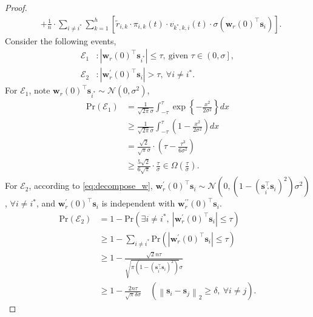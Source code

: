 \documentclass[10pt]{article}
\def\rvs{{\mathbf{s}}}
\def\rvw{{\mathbf{w}}}
\def\pr{{\text{Pr}}}
\def\gN{{\mathcal{N}}}
\def\gE{{\mathcal{E}}}
\begin{document}
\begin{proof}
\begin{equation}
\begin{split}
	&+ \frac{1}{n} \cdot \sum\limits_{i \not= i^*}{\sum\limits_{k=1}^{h}{ \left[ \tilde{r}_{i,k} \cdot \pi_{i,k}(t) \cdot v_{k^*,k,i}(t) \cdot \sigma( \rvw_r(0)^\top \rvs_i ) \right] } }.
\end{split}
\end{equation}
Consider the following events,
\begin{equation*}
\begin{split}
	\gE_1 &: \left| \rvw_r(0)^\top \rvs_{i^*} \right| \le \tau, \ \text{given } \tau \in \left( 0, \sigma \right], \\
	\gE_2 &: \left| \rvw_r^\prime(0)^\top \rvs_i \right| > \tau, \ \forall i \not= i^*.
\end{split}
\end{equation*}
For $\gE_1$, note $\rvw_r(0)^\top \rvs_{i^*} \sim \gN(0, \sigma^2)$,
\begin{equation*}
\begin{split}
	\pr\left(\gE_1\right) &= \frac{1}{\sqrt{2\pi}\sigma} \int_{-\tau}^{\tau}{\exp\left\{ - \frac{x^2}{2\sigma^2} \right\} dx} \\
	&\ge \frac{1}{\sqrt{2\pi}\sigma} \int_{-\tau}^{\tau}{ \left( 1  - \frac{x^2}{2\sigma^2} \right) dx} \\
	&= \frac{\sqrt{2}}{\sqrt{\pi}\sigma} \cdot \left( \tau - \frac{\tau^3}{6\sigma^2}\right) \\
	&\ge \frac{5\sqrt{2}}{6\sqrt{\pi}} \cdot \frac{\tau}{\sigma} \in \Omega\left( \frac{\tau}{\sigma} \right).
\end{split}
\end{equation*}
For $\gE_2$, according to \cref{eq:decompose_w}, $\rvw_r^\prime(0)^\top \rvs_i \sim \gN\left(0, \left(1 - \left(\rvs_{i^*}^\top \rvs_{i} \right)^2 \right)\sigma^2 \right)$, $\forall i \not= i^*$, and $\rvw_r^\prime(0)^\top \rvs_i$ is independent with $\rvw_r^{\prime\prime}(0)^\top \rvs_{i}$.
\begin{equation*}
\begin{split}
	\pr\left(\gE_2\right) &= 1 - \pr\left( \exists i \not= i^*, \ \left| \rvw_r^\prime(0)^\top \rvs_i \right| \le \tau \right) \\
	&\ge 1 - \sum\limits_{i \not= i^*}{ \pr\left(\left| \rvw_r^\prime(0)^\top \rvs_i \right| \le \tau \right) } \\
	&\ge 1 - \frac{\sqrt{2}n\tau}{\sqrt{\pi\left( 1 - \left(\rvs_{i^*}^\top \rvs_{i} \right)^2 \right) }\sigma} \\
	&\ge 1 - \frac{2n\tau}{\sqrt{\pi}\delta\sigma} \quad \left( \left\| \rvs_{i} -  \rvs_{j} \right\|_2 \ge \delta, \ \forall i \not= j \right).

\end{split}
\end{equation*}
\end{proof}
\end{document}
